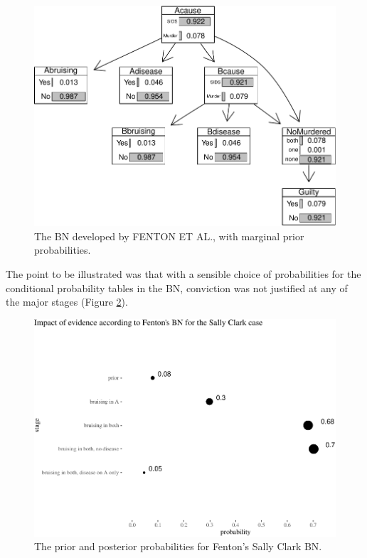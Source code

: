 \documentclass[
  10pt,
  dvipsnames,enabledeprecatedfontcommands]{scrartcl}
\begin{document}
\begin{figure}[H]

\begin{center}\includegraphics[width=0.8\linewidth]{chapter-outline_files/figure-latex/scBNplot2-1} \end{center}
\caption{The BN developed by FENTON ET AL., with marginal prior probabilities.}
\label{fig:scBNplot}
\end{figure}

The point to be illustrated was that with a sensible choice of
probabilities for the conditional probability tables in the BN,
conviction was not justified at any of the major stages (Figure
\ref{fig:SCfentonTable}).

\begin{figure}[H]

\begin{center}\includegraphics[width=0.9\linewidth]{chapter-outline_files/figure-latex/SCfentonTable2-1} \end{center}

\caption{The prior and posterior probabilities for Fenton's Sally Clark BN.}

\label{fig:SCfentonTable}

\end{figure}
\end{document}
